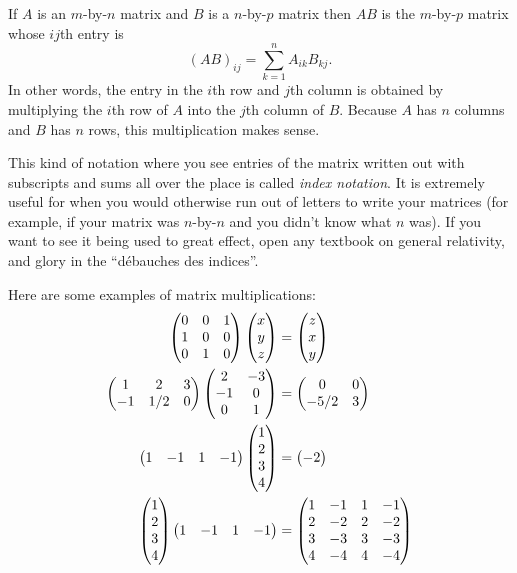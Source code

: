\documentclass{article}
\begin{document}
\begin{Definition}
If \(A\) is an \(m\)-by-\(n\) matrix and \(B\) is a \(n\)-by-\(p\)
matrix then \(AB\) is the \(m\)-by-\(p\) matrix whose \(ij\)th entry
is \[(AB)_{ij}=\sum_{k=1}^nA_{ik}B_{kj}.\] In other words, the entry
in the \(i\)th row and \(j\)th column is obtained by multiplying the
\(i\)th row of \(A\) into the \(j\)th column of \(B\). Because \(A\)
has \(n\) columns and \(B\) has \(n\) rows, this multiplication
makes sense.


\end{Definition}
\begin{Remark}
This kind of notation where you see entries of the matrix written
out with subscripts and sums all over the place is called {\em index
notation}. It is extremely useful for when you would otherwise run
out of letters to write your matrices (for example, if your matrix
was \(n\)-by-\(n\) and you didn't know what \(n\) was). If you want
to see it being used to great effect, open any textbook on general
relativity, and glory in the ``d\'{e}bauches des indices''.


\end{Remark}
\begin{Example}
Here are some examples of matrix multiplications:
\begin{align*}
\begin{pmatrix} 0 & 0 & 1 \\ 1 & 0 & 0 \\ 0 & 1 & 0\end{pmatrix} \begin{pmatrix} x \\ y \\ z\end{pmatrix}&=\begin{pmatrix} z \\ x \\ y\end{pmatrix}\\
\begin{pmatrix} 1 & 2 & 3 \\ -1 & 1/2 & 0\end{pmatrix} \begin{pmatrix} 2 & -3 \\ -1 & 0 \\ 0 & 1\end{pmatrix}&=\begin{pmatrix} 0 & 0 \\ -5/2 & 3\end{pmatrix}\\
\begin{pmatrix} 1 & -1 & 1 & -1\end{pmatrix}\begin{pmatrix} 1 \\ 2 \\ 3 \\ 4\end{pmatrix}&=\begin{pmatrix} -2\end{pmatrix}\\
\begin{pmatrix} 1 \\ 2 \\ 3 \\ 4\end{pmatrix}\begin{pmatrix} 1 & -1 & 1 & -1\end{pmatrix}&=\begin{pmatrix} 1 & -1 & 1 & -1\\ 2 & -2 & 2 & -2\\ 3 & -3 & 3 & -3\\4 & -4 & 4 & -4\end{pmatrix}
\end{align*}


\end{Example}
\end{document}
